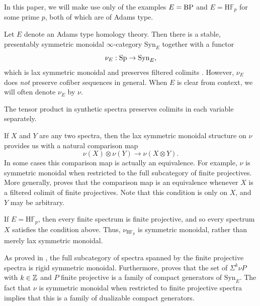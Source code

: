 \begin{exm}%
  In this paper, we will make use only of the examples $E=\mathrm{BP}$ and $E=\mathrm{H}\mathbb{F}_p$ for some prime $p$, both of which are of Adams type.
\end{exm}

\begin{cnstr}
Let $E$ denote an Adams type homology theory.  Then there is a stable, presentably symmetric monoidal $\infty$-category $\mathrm{Syn}_E$ together with a functor
$$\nu_E:\operatorname{\mathrm{Sp}} \to \mathrm{Syn}_E,$$ 
which is lax symmetric monoidal and preserves filtered colimits \cite[Lemma 4.4]{Pstragowski}.  However, $\nu_E$ does \emph{not} preserve cofiber sequences in general. When $E$ is clear from context, we will often denote $\nu_E$ by $\nu$.
\end{cnstr}

\begin{rmk}
The tensor product in synthetic spectra preserves colimits in each variable separately.
\end{rmk}

\begin{rmk} \label{rmk:strong-monoidal}
If $X$ and $Y$ are any two spectra, then the lax symmetric monoidal structure on $\nu$ provides us with a natural comparison map
$$ \nu(X) \otimes \nu(Y) \to \nu(X \otimes Y). $$
In some cases this comparison map is actually an equivalence.
For example, $\nu$ is symmetric monoidal when restricted to the full subcategory of finite projectives.
More generally, \cite[Lemma 4.24]{Pstragowski} proves that the comparison map is an equivalence whenever $X$ is a filtered colimit of finite projectives. Note that this condition is only on $X$, and $Y$ may be arbitrary.

If $E=\mathrm{H}\mathbb{F}_p$, then every finite spectrum is finite projective, and so every spectrum $X$ satisfies the condition above. Thus, $\nu_{\mathrm{H}\mathbb{F}_p}$ is symmetric monoidal, rather than merely lax symmetric monoidal.
\end{rmk}

\begin{rmk} \label{rmk:dualizable-generators}
  As proved in \cite[Lemma 3.18]{Pstragowski}, the full subcategory of spectra spanned by the finite projective spectra is rigid symmetric monoidal.
  Furthermore, \cite[Remark 4.14]{Pstragowski} proves that the set of $\Sigma^k \nu P$ with $k \in \mathbb{Z}$ and $P$ finite projective is a family of compact generators of $\mathrm{Syn}_E$. The fact that $\nu$ is symmetric monoidal when restricted to finite projective spectra implies that this is a family of dualizable compact generators.
\end{rmk}

